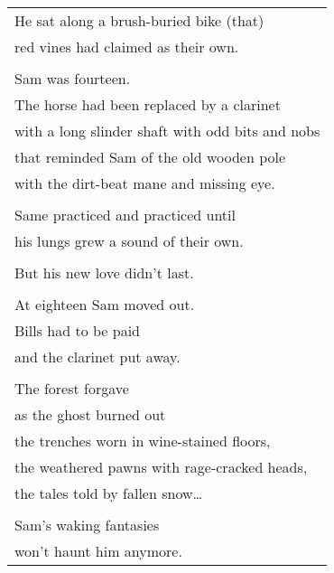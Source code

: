 \documentclass{article}
\begin{document}
\begin{center}
\begin{tabular}{l}
He sat along a brush-buried bike (that) \\
red vines had claimed as their own. \\
\\
\hspace*{2ex}Sam was fourteen. \\
\hspace*{2ex}The horse had been replaced by a clarinet \\
\hspace*{2ex}with a long slinder shaft with odd bits and nobs \\
\hspace*{2ex}that reminded Sam of the old wooden pole \\
\hspace*{2ex}with the dirt-beat mane and missing eye. \\
\\
\hspace*{2ex}Same practiced and practiced until \\
\hspace*{2ex}his lungs grew a sound of their own. \\
\\
\hspace*{2ex}But his new love didn't last. \\
\\
\hspace*{2ex}At eighteen Sam moved out. \\
\hspace*{2ex}Bills had to be paid \\
\hspace*{2ex}and the clarinet put away. \\
\\
The forest forgave \\
as the ghost burned out \\
the trenches worn in wine-stained floors, \\
the weathered pawns with rage-cracked heads, \\
the tales told by fallen snow\ldots \\
\\
Sam's waking fantasies \\
won't haunt him anymore. \\
\end{tabular}
\end{center}
\end{document}
